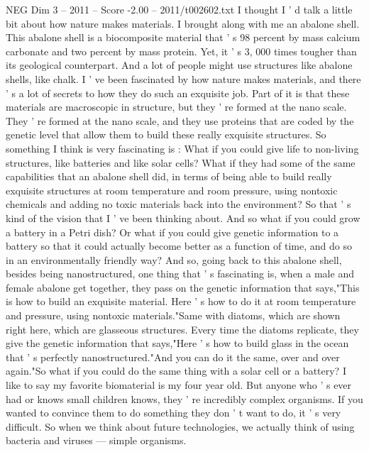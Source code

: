 \begin{textsample}{NEG Dim 3 – 2011 – Score -2.00 – 2011/t002602.txt}  \label{ex:f3_neg_022}
I thought I ' d talk a little bit about how nature makes materials.
I brought along with me an abalone shell.
This abalone shell is a biocomposite material that ' s 98 percent by mass calcium carbonate and two percent by mass protein.
Yet, it ' s 3, 000 times tougher than its geological counterpart.
And a lot of people might use structures like abalone shells, like chalk.
I ' ve been fascinated by how nature makes materials, and there ' s a lot of secrets to how they do such an exquisite job.
Part of it is that these materials are macroscopic in structure, but they ' re formed at the nano scale.
They ' re formed at the nano scale, and they use proteins that are coded by the genetic level that allow them to build these really exquisite structures.
So something I think is very fascinating is : What if you could give life to non-living structures, like batteries and like solar cells?
What if they had some of the same capabilities that an abalone shell did, in terms of being able to build really exquisite structures at room temperature and room pressure, using nontoxic chemicals and adding no toxic materials back into the environment?
So that ' s kind of the vision that I ' ve been thinking about.
And so what if you could grow a battery in a Petri dish?
Or what if you could give genetic information to a battery so that it could actually become better as a function of time, and do so in an environmentally friendly way?
And so, going back to this abalone shell, besides being nanostructured, one thing that ' s fascinating is, when a male and female abalone get together, they pass on the genetic information that says,"This is how to build an exquisite material.
Here ' s how to do it at room temperature and pressure, using nontoxic materials."Same with diatoms, which are shown right here, which are glasseous structures.
Every time the diatoms replicate, they give the genetic information that says,"Here ' s how to build glass in the ocean that ' s perfectly nanostructured."And you can do it the same, over and over again."So what if you could do the same thing with a solar cell or a battery?
I like to say my favorite biomaterial is my four year old.
But anyone who ' s ever had or knows small children knows, they ' re incredibly complex organisms.
If you wanted to convince them to do something they don ' t want to do, it ' s very difficult.
So when we think about future technologies, we actually think of using bacteria and viruses — simple organisms.

\end{textsample}
